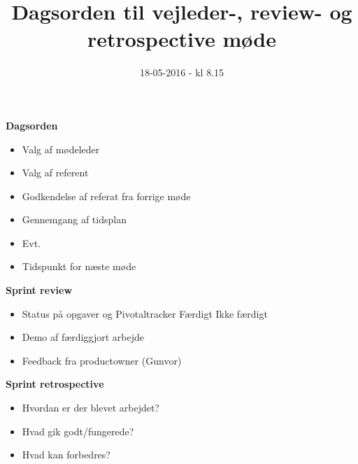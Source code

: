\documentclass{article}
\title{Dagsorden til vejleder-, review- og retrospective møde}
\date{18-05-2016 - kl 8.15}
\begin{document}
	\maketitle
	\textbf{Dagsorden}
	
	\begin{itemize}
		\item Valg af mødeleder
		\item Valg af referent
		\item Godkendelse af referat fra forrige møde
		\item Gennemgang af tidsplan
		\item Evt.
		\item Tidspunkt for næste møde\\
	\end{itemize}
	
	\textbf{Sprint review}
	\begin{itemize}
		\item Status på opgaver og Pivotaltracker
			\subitem Færdigt
			\subitem Ikke færdigt
		\item Demo af færdiggjort arbejde
		\item Feedback fra productowner (Gunvor)\\
	\end{itemize}
	
	\textbf{Sprint retrospective}
	\begin{itemize}
		\item Hvordan er der blevet arbejdet?
		\item Hvad gik godt/fungerede?
		\item Hvad kan forbedres?\\
	\end{itemize}
\end{document}
